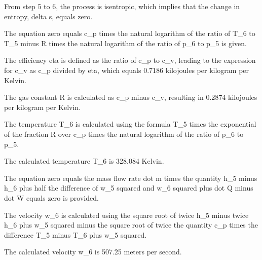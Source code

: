 From step 5 to 6, the process is isentropic, which implies that the change in entropy, delta s, equals zero.

The equation zero equals c_p times the natural logarithm of the ratio of T_6 to T_5 minus R times the natural logarithm of the ratio of p_6 to p_5 is given.

The efficiency eta is defined as the ratio of c_p to c_v, leading to the expression for c_v as c_p divided by eta, which equals 0.7186 kilojoules per kilogram per Kelvin.

The gas constant R is calculated as c_p minus c_v, resulting in 0.2874 kilojoules per kilogram per Kelvin.

The temperature T_6 is calculated using the formula T_5 times the exponential of the fraction R over c_p times the natural logarithm of the ratio of p_6 to p_5.

The calculated temperature T_6 is 328.084 Kelvin.

The equation zero equals the mass flow rate dot m times the quantity h_5 minus h_6 plus half the difference of w_5 squared and w_6 squared plus dot Q minus dot W equals zero is provided.

The velocity w_6 is calculated using the square root of twice h_5 minus twice h_6 plus w_5 squared minus the square root of twice the quantity c_p times the difference T_5 minus T_6 plus w_5 squared.

The calculated velocity w_6 is 507.25 meters per second.